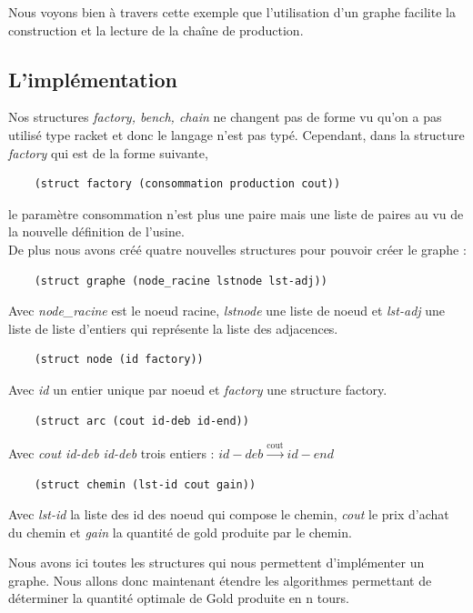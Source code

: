\indent Nous voyons bien à travers cette exemple que l'utilisation d'un graphe facilite la construction et la lecture de la chaîne de production.

\subsection{L'implémentation }

Nos structures \textit{factory, bench, chain} ne changent pas de forme vu qu'on a pas utilisé type racket et donc le langage n'est pas typé. Cependant, dans la structure \textit{factory}
qui est de la forme suivante,
\begin{verbatim} 
    (struct factory (consommation production cout))
\end{verbatim}
 le paramètre consommation n'est plus une paire mais une liste de paires au vu de la nouvelle définition de l'usine.\\ 
 \smallbreak
 De plus nous avons créé quatre nouvelles structures pour pouvoir créer le graphe :
\begin{verbatim}
    (struct graphe (node_racine lstnode lst-adj))
\end{verbatim}

Avec \textit{node\_racine} est le noeud racine, \textit{lstnode} une liste de noeud et \textit{lst-adj} une liste de liste d'entiers qui représente la liste des adjacences.

\begin{verbatim}
    (struct node (id factory))
\end{verbatim}

Avec \textit{id} un entier unique par noeud et \textit{factory} une structure factory.

\begin{verbatim}
    (struct arc (cout id-deb id-end))
\end{verbatim}


Avec \textit{cout id-deb id-deb} trois entiers :
$id-deb \xrightarrow{\text{cout}} id-end$


\begin{verbatim}
    (struct chemin (lst-id cout gain))
\end{verbatim}

Avec \textit{lst-id} la liste des id des noeud qui compose le chemin, \textit{cout} le prix d'achat du chemin et \textit{gain} la quantité de gold produite par le chemin.

Nous avons ici toutes les structures qui nous permettent d'implémenter un graphe. Nous allons donc maintenant étendre les algorithmes permettant de déterminer la quantité optimale de Gold produite en n tours. 

